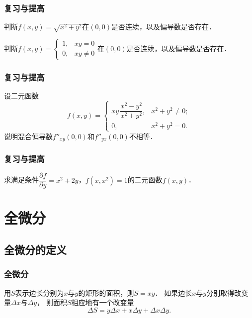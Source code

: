 \documentclass[14pt,notheorems,leqno,xcolor={rgb}]{beamer} %
\begin{document}
\begin{frame}
\frametitle{复习与提高}
\begin{puzzle}
判断$f(x,y)=\sqrt{x^2+y^2}$在$(0,0)$是否连续，以及偏导数是否存在．
\end{puzzle}
\vpause
\begin{puzzle}
判断$f(x,y)=\begin{cases}
  1, & xy=0 \\
  0, & xy\neq0
\end{cases}$在$(0,0)$是否连续，以及偏导数是否存在．
\end{puzzle}
\end{frame}

\begin{frame}
\frametitle{复习与提高}
\begin{puzzle}
设二元函数
$$f(x,y)=\begin{cases}
  xy\,\dfrac{x^2-y^2}{x^2+y^2}, & x^2+y^2\neq0; \\
  0, & x^2+y^2=0.
\end{cases}$$
说明混合偏导数$f''_{xy}(0,0)$和$f''_{yx}(0,0)$不相等．
\end{puzzle}
\end{frame}

\begin{frame}
\frametitle{复习与提高}
\begin{puzzle}
求满足条件$\dfrac{\partial f}{\partial y}=x^2+2y$，$f(x,x^2)=1$的二元函数$f(x,y)$．
\end{puzzle}
\end{frame}

\section{全微分}

\subsection{全微分的定义}

\begin{frame}
\frametitle{全微分}
\begin{example*}
用$S$表示边长分别为$x$与$y$的矩形的面积，则$S=xy$．\pause
如果边长$x$与$y$分别取得改变量$\Delta x$与$\Delta y$，\pause
则面积$S$相应地有一个改变量
\[ \Delta S = y \Delta x + x \Delta y + \Delta x\Delta y. \]
\end{example*}
\end{frame}
\end{document}
